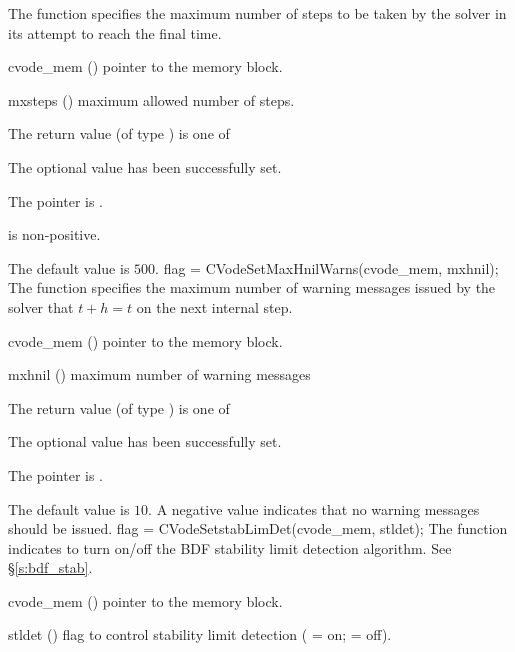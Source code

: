 {
  The function  specifies the maximum number
  of steps to be taken by the solver in its attempt to reach 
  the final time.
}
{
  \begin{args}
  \item[cvode\_mem] ()
    pointer to the {\cvode} memory block.
  \item[mxsteps] ()
    maximum allowed number of steps.
  \end{args}
}
{
  The return value  (of type ) is one of
  \begin{args}
  \item[\Id{CV\_SUCCESS}] 
    The optional value has been successfully set.
  \item[\Id{CV\_MEM\_NULL}]
    The  pointer is .
  \item[\Id{CV\_ILL\_INPUT}]
     is non-positive.
  \end{args}
}
{
  The default value is $500$.
}
{
flag = CVodeSetMaxHnilWarns(cvode\_mem, mxhnil);
}
{
  The function  specifies the maximum number of warning
  messages issued by the solver that $t+h=t$ on the next internal step.
}
{
  \begin{args}
  \item[cvode\_mem] ()
    pointer to the {\cvode} memory block.
  \item[mxhnil] ()
    maximum number of warning messages
  \end{args}
}
{
  The return value  (of type ) is one of
  \begin{args}
  \item[\Id{CV\_SUCCESS}] 
    The optional value has been successfully set.
  \item[\Id{CV\_MEM\_NULL}]
    The  pointer is .
  \end{args}
}
{
  The default value is $10$.
  A negative  value indicates that no warning messages should
  be issued.
}
{
flag = CVodeSetstabLimDet(cvode\_mem, stldet);
}
{
  The function  indicates to turn on/off
  the BDF stability limit detection algorithm. See \S\ref{s:bdf_stab}.
}
{
  \begin{args}
  \item[cvode\_mem] ()
    pointer to the {\cvode} memory block.
  \item[stldet] ()
    flag to control stability limit detection ( = on;  = off).
  \end{args}
}
